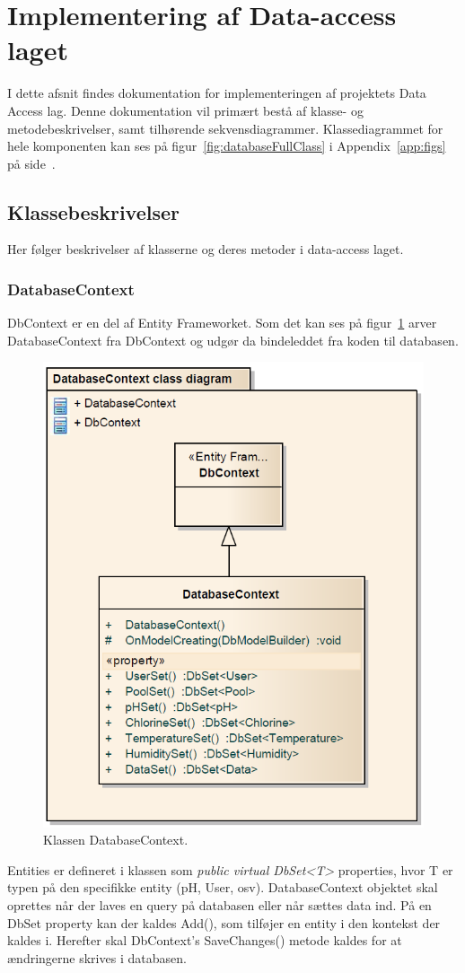 \section{Implementering af Data-access laget}
I dette afsnit findes dokumentation for implementeringen af projektets Data Access lag. Denne dokumentation vil primært bestå af klasse- og metodebeskrivelser, samt tilhørende sekvensdiagrammer. Klassediagrammet for hele komponenten kan ses på figur~\ref{fig:databaseFullClass} i Appendix~\ref{app:figs} på side~\pageref{fig:databaseFullClass}.

\subsection{Klassebeskrivelser}
Her følger beskrivelser af klasserne og deres metoder i data-access laget.

\subsubsection{DatabaseContext}
DbContext er en del af Entity Frameworket. Som det kan ses på figur~\ref{fig:dbContextClass} arver DatabaseContext fra DbContext \cite{microsoftdbcontext} og udgør da bindeleddet fra koden til databasen.

\begin{figure}[H]
\centering
\includegraphics[width=0.5\linewidth]{figs/implementering/dbContextClass.PNG}
\caption{Klassen DatabaseContext.}
\label{fig:dbContextClass}
\end{figure}

Entities er defineret i klassen som \textit{public virtual DbSet<T>} properties, hvor T er typen på den specifikke entity (pH, User, osv).
DatabaseContext objektet skal oprettes når der laves en query på databasen eller når sættes data ind.
På en DbSet property kan der kaldes Add(), som tilføjer en entity i den kontekst der kaldes i. Herefter skal DbContext’s SaveChanges() metode kaldes for at ændringerne skrives i databasen.

